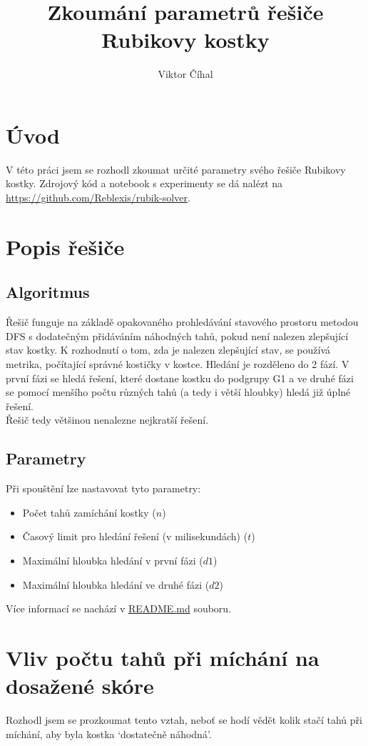 \documentclass{article}
\title{Zkoumání parametrů řešiče Rubikovy kostky}
\author{Viktor Číhal}
\date{}
\begin{document}
\maketitle
\section*{Úvod}
V této práci jsem se rozhodl zkoumat určité parametry svého řešiče Rubikovy kostky.
Zdrojový kód a notebook s experimenty se dá nalézt na \url{https://github.com/Reblexis/rubik-solver}.

\section*{Popis řešiče}
\subsection*{Algoritmus}
Řešič funguje na základě opakovaného prohledávání stavového prostoru metodou DFS
s dodatečným přidáváním náhodných tahů, pokud není nalezen zlepšující stav kostky.
K rozhodnutí o tom, zda je nalezen zlepšující stav, se používá metrika, počítající
správné kostičky v kostce. Hledání je rozděleno do 2 fází. V první fázi se hledá
řešení, které dostane kostku do podgrupy G1 a ve druhé fázi se pomocí menšího počtu
různých tahů (a tedy i větší hloubky) hledá již úplné řešení.\\
Řešič tedy většinou nenalezne nejkratší řešení.

\subsection*{Parametry}
Při spouštění lze nastavovat tyto parametry:
\begin{itemize}
    \item Počet tahů zamíchání kostky ($n$)
    \item Časový limit pro hledání řešení (v milisekundách) ($t$)
    \item Maximální hloubka hledání v první fázi ($d1$)
    \item Maximální hloubka hledání ve druhé fázi ($d2$)
\end{itemize}

Více informací se nachází v \href{https://github.com/Reblexis/rubik-solver/blob/main/README.md}{README.md} souboru.

\section*{Vliv počtu tahů při míchání na dosažené skóre}
Rozhodl jsem se prozkoumat tento vztah, neboť se hodí vědět kolik stačí tahů při míchání, aby byla kostka
`dostatečně náhodná'. \\
\end{document}
